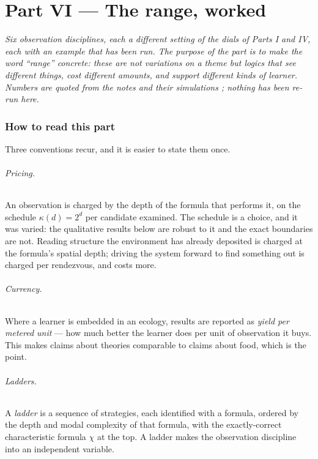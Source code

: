 \part*{Part VI --- The range, worked}

\bigskip
\noindent
\emph{Six observation disciplines, each a different setting of the dials of
Parts I and IV, each with an example that has been run. The purpose of the part is
to make the word ``range'' concrete: these are not variations on a theme but
logics that see different things, cost different amounts, and support different
kinds of learner. Numbers are quoted from the notes and their simulations
\cite{GameNote,ComposeNote,GradedWhere,QuorumNote,ScopeNote}; nothing has been
re-run here.}
\bigskip

\section{How to read this part}
\label{sec:howread}

Three conventions recur, and it is easier to state them once.

\paragraph{Pricing.} An observation is charged by the depth of the formula that
performs it, on the schedule $\kappa(d) = 2^{d}$ per candidate examined. The
schedule is a choice, and it was varied: the qualitative results below are robust
to it and the exact boundaries are not. Reading structure the environment has
already deposited is charged at the formula's spatial depth; driving the system
forward to find something out is charged per rendezvous, and costs more.

\paragraph{Currency.} Where a learner is embedded in an ecology, results are
reported as \emph{yield per metered unit} --- how much better the learner does per
unit of observation it buys. This makes claims about theories comparable to claims
about food, which is the point.

\paragraph{Ladders.} A \emph{ladder} is a sequence of strategies, each identified
with a formula, ordered by the depth and modal complexity of that formula, with
the exactly-correct characteristic formula $\chi$ at the top. A ladder makes the
observation discipline into an independent variable.

